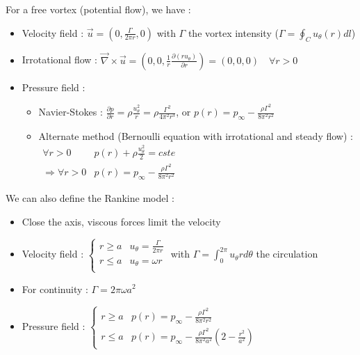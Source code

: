 \documentclass[../main.tex]{subfiles}
\begin{document}
For a free vortex (potential flow), we have : \begin{itemize}
    \item Velocity field : $\Vec{u} = (0, \frac{\Gamma}{2\pi r},0)$ with $\Gamma$ the vortex intensity ($\Gamma = \oint_C u_\theta(r)dl$)
    \item Irrotational flow : $\Vec{\nabla} \times \Vec{u} = (0,0,\frac{1}{r} \frac{\partial (ru_\theta)}{\partial r}) = (0,0,0) \quad \forall r>0$
    \item Pressure field : \begin{itemize}
        \item Navier-Stokes : $\frac{\partial p}{\partial r} = \rho \frac{u_\theta^2}{r} = \rho \frac{\Gamma^2}{4\pi^2 r^3}$, or $p(r) = p_\infty - \frac{\rho \Gamma^2}{8\pi^2 r^2}$
        \item Alternate method (Bernoulli equation with irrotational and steady flow) : $\begin{matrix}
            \forall r>0 & p(r) + \rho \frac{u_\theta^2}{2} = cste\\
            \Rightarrow \forall r>0 & p(r) = p_\infty - \frac{\rho \Gamma^2}{8\pi^2 r^2}
        \end{matrix}$
    \end{itemize}
\end{itemize}

We can also define the Rankine model : \begin{itemize}
    \item Close the axis, viscous forces limit the velocity
    \item Velocity field : $\begin{cases}
        r\geq a & u_\theta = \frac{\Gamma}{2\pi r}\\
        r\leq a & u_\theta = \omega r\\
    \end{cases}$
    with $\Gamma = \int_0^{2\pi} u_\theta r d\theta$ the circulation
    \item For continuity : $\Gamma = 2\pi \omega a^2$
    \item Pressure field : $\begin{cases}
        r\geq a & p(r) = p_\infty - \frac{\rho \Gamma^2}{8\pi^2 r^2}\\
        r \leq a & p(r) = p_\infty - \frac{\rho \Gamma^2}{8\pi^2 a^2}(2-\frac{r^2}{a^2})
    \end{cases}$
\end{itemize}
\end{document}

